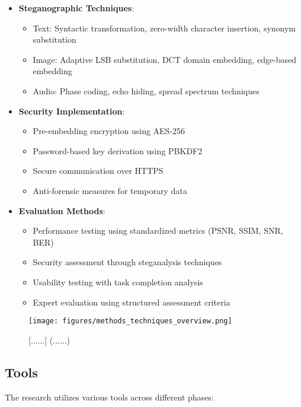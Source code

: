 \documentclass[12pt, a4paper, oneside]{book}
\begin{document}
\begin{itemize}[leftmargin=*]
    \item \textbf{Steganographic Techniques}:
    \begin{itemize}
        \item Text: Syntactic transformation, zero-width character insertion, synonym substitution
        \item Image: Adaptive LSB substitution, DCT domain embedding, edge-based embedding
        \item Audio: Phase coding, echo hiding, spread spectrum techniques
    \end{itemize}

    \item \textbf{Security Implementation}:
    \begin{itemize}
        \item Pre-embedding encryption using AES-256
        \item Password-based key derivation using PBKDF2
        \item Secure communication over HTTPS
        \item Anti-forensic measures for temporary data
    \end{itemize}

    \item \textbf{Evaluation Methods}:
    \begin{itemize}
        \item Performance testing using standardized metrics (PSNR, SSIM, SNR, BER)
        \item Security assessment through steganalysis techniques
        \item Usability testing with task completion analysis
        \item Expert evaluation using structured assessment criteria
    \end{itemize}
\end{itemize}

\begin{figure}[htbp]
    \centering
    \texttt{[image: figures/methods\_techniques\_overview.png]}
    \caption{[......] (......)}
    \label{fig:methods_techniques}
\end{figure}

\subsection{Tools}
The research utilizes various tools across different phases:
\end{document}
